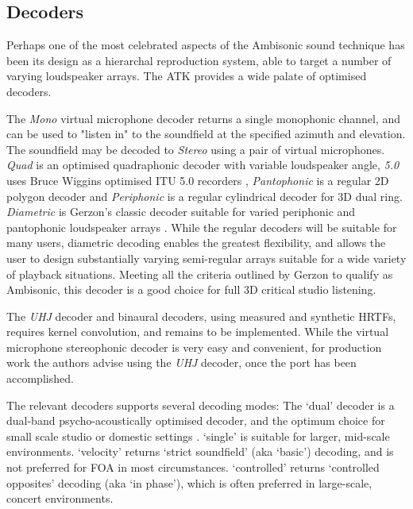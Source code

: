 \documentclass{article}
\begin{document}



\subsection{Decoders}\label{sec:decoders}

Perhaps one of the most celebrated aspects of the Ambisonic sound technique has been its design as a hierarchal reproduction system, able to target a number of varying loudspeaker arrays.
The ATK provides a wide palate of optimised decoders.

The \emph{Mono} virtual microphone decoder returns a single monophonic channel, and can be used to "listen in" to the soundfield at the specified azimuth and elevation.
The soundfield may be decoded to \emph{Stereo} using a pair of virtual microphones.
\emph{Quad} is an optimised quadraphonic decoder with variable loudspeaker angle, \emph{5.0} uses Bruce Wiggins optimised ITU 5.0 recorders \cite{wiggins:2003optimised}, \emph{Pantophonic} is a regular 2D polygon decoder and \emph{Periphonic} is a regular cylindrical decoder for 3D dual ring.
\emph{Diametric} is Gerzon's classic decoder suitable for varied periphonic and pantophonic loudspeaker arrays \cite{gerzon:1980sphere}.
While the regular decoders will be suitable for many users, diametric decoding enables the greatest flexibility, and allows the user to design substantially varying semi-regular arrays suitable for a wide variety of playback situations.
Meeting all the criteria outlined by Gerzon to qualify as Ambisonic, this decoder is a good choice for full 3D critical studio listening.

The \emph{UHJ} decoder and binaural decoders, using measured and synthetic HRTFs, requires kernel convolution, and remains to be implemented.
While the virtual microphone stereophonic decoder is very easy and convenient, for production work the authors advise using the \emph{UHJ} decoder, once the port has been accomplished.

The relevant decoders supports several decoding modes: 
The `dual' decoder is a dual-band psycho-acoustically optimised decoder, and the optimum choice for small scale studio or domestic settings \cite{heller:2008isAmbisonic}.
`single' is suitable for larger, mid-scale environments.
`velocity' returns `strict soundfield' (aka `basic') decoding, and is not preferred for FOA in most circumstances.
`controlled' returns `controlled opposites' decoding (aka `in phase'), which is often preferred in large-scale, concert environments.
\end{document}
